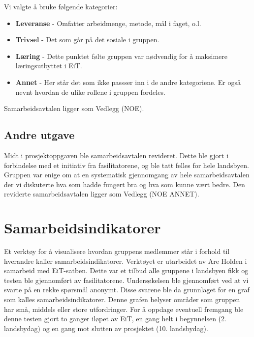 Vi valgte å bruke følgende kategorier:
\begin{itemize}
    \item \textbf{Leveranse} - Omfatter arbeidmenge, metode, mål i faget, o.l.
    \item \textbf{Trivsel} - Det som går på det sosiale i gruppen. 
    \item \textbf{Læring} - Dette punktet følte gruppen var nødvendig for å maksimere læringsutbyttet i EiT. 
    \item \textbf{Annet} - Her står det som ikke passser inn i de andre kategoriene. Er også nevnt hvordan de ulike rollene i gruppen fordeles. 
\end{itemize}
Samarbeidsavtalen ligger som Vedlegg (NOE). 

\subsection{Andre utgave}
Midt i prosjektoppgaven ble samarbeidsavtalen revideret. 
Dette ble gjort i forbindelse med et initiativ fra fasilitatorene, og ble tatt felles for hele landsbyen. 
Gruppen var enige om at en systematisk gjennomgang av hele samarbeidsavtalen der vi diskuterte hva som hadde fungert bra og hva som kunne vært bedre. 
\vspace{\secspace}
Den reviderte samarbeidsavtalen ligger som Vedlegg (NOE ANNET).  

\section{Samarbeidsindikatorer}
Et verktøy for å visualisere hvordan gruppens medlemmer står i forhold til hverandre kaller samarbeidsindikatorer. 
Verktøyet er utarbeidet av Are Holden i samarbeid med EiT-satben. 
Dette var et tilbud alle gruppene i landsbyen fikk og testen ble gjennomført av fasilitatorene. 
Undersøkelsen ble gjennomført ved at vi svarte på en rekke spørsmål anonymt. 
Disse svarene ble da grunnlaget for en graf som kalles samarbeidsindikatorer. 
Denne grafen belyser områder som gruppen har små, middels eller store utfordringer. 
For å oppdage eventuell fremgang ble denne testen gjort to ganger iløpet av EiT, en gang helt i begynnelsen (2. landsbydag) og en gang mot slutten av prosjektet (10. landsbydag). 

